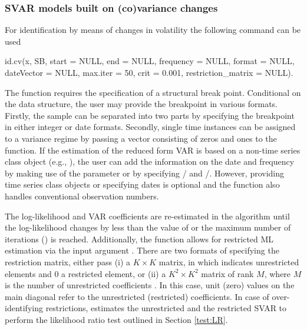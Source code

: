 \documentclass[nojss]{jss}\usepackage[]{graphicx}\usepackage[]{color}
\begin{document}
\subsubsection{SVAR models built on (co)variance changes}

For identification by means of changes in volatility the following command can be used
\begin{CodeChunk}
	\begin{CodeInput}
id.cv(x, SB, start = NULL, end = NULL, frequency = NULL, format = NULL,
  dateVector = NULL, max.iter = 50, crit = 0.001,
  restriction_matrix = NULL).
    \end{CodeInput}
\end{CodeChunk}
The function  requires the specification of a structural break point. Conditional on the data structure, the user may provide the breakpoint  in various formats. Firstly, the sample can be separated into two parts by specifying the breakpoint in either integer or date formats. Secondly, single time instances can be assigned to a variance regime by passing a vector consisting of zeros and ones to the function. If the estimation of the reduced form VAR is based on a non-time series class object (e.g., ), the user can add the information on the date and frequency by making use of the parameter  or by specifying / and /. However, providing time series class objects or specifying dates is optional and the function also handles conventional observation numbers.

The log-likelihood and VAR coefficients are re-estimated in the algorithm until the log-likelihood changes by less than the value of  or the maximum number of iterations () is reached. Additionally, the function  allows for restricted ML estimation via the input argument .
There are two formats of specifying the restriction matrix, either pass (i) a $K \times K$ matrix, in which  indicates unrestricted elements and $0$ a restricted element, or (ii) a $K^2 \times K^2$ matrix of rank $M$, where $M$ is the number of unrestricted coefficients \citep{IntroductionMultipleTS}. In this case, unit (zero) values on the main diagonal refer to the unrestricted (restricted) coefficients. In case of over-identifying restrictions,  estimates the unrestricted and the restricted SVAR to perform the likelihood ratio test outlined in Section \ref{test:LR}.
\end{document}
